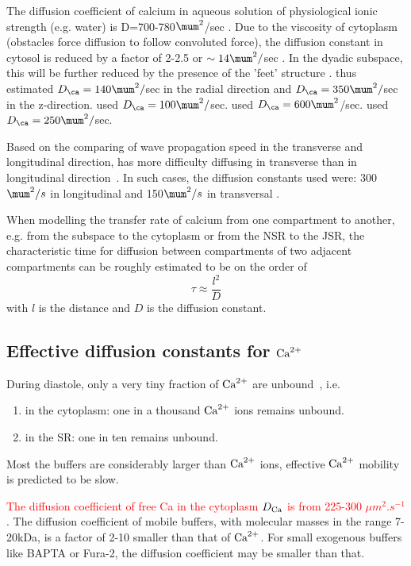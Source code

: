 The diffusion coefficient of calcium in aqueous solution of
physiological ionic strength (e.g. water) is D=700-780$\mum^2$/sec
\citep{wang1953}. Due to the viscosity of cytoplasm (obstacles force diffusion
to follow convoluted force), the diffusion constant in cytosol is reduced by a
factor of 2-2.5 or $\sim 14\mum^2/$sec \citep{kushmeric1969}. In the dyadic
subspace, this will be further reduced by the presence of the 'feet' structure
\citep{sommer1976}.
\citep{soeller1997} thus estimated $D_\ca = 140\mum^2/$sec in the radial
direction and $D_\ca = 350\mum^2/$sec in the z-direction. \citep{langer1996}
used $D_\ca = 100\mum^2/$sec. \citep{pratusevich1996} used $D_\ca =
600\mum^2$/sec. \citep{smith1998, sun2000mlc,groff2008} used $D_\ca=
250\mum^2/$sec. 

Based on the comparing of wave propagation speed in the transverse and
longitudinal direction,  has more difficulty diffusing in transverse
than in longitudinal direction~\citep{engel1994apc}. In such cases, the
diffusion constants used were:
300$\mum^2/s$ in longitudinal and 150$\mum^2/s$ in transversal
\citep{izu2006irr}.

When modelling the transfer rate of calcium from one compartment to another,
e.g. from the subspace to the cytoplasm or from the NSR to the JSR, the
characteristic time for diffusion between compartments of two adjacent
compartments can be roughly estimated to be on the order of 
\begin{equation}
\tau \approx \frac{l^2}{D}
\end{equation}
with $l$ is the distance and $D$ is the diffusion constant. 

\subsection{Effective diffusion constants for ${\text{Ca}^{2+}}$}
\label{sec:effect-diff-const}



During diastole, only a very tiny fraction of ${\text{Ca}^{2+}}$ are
unbound~\citep{Swietach2010}, i.e.
\begin{enumerate}
\item in the cytoplasm: one in a thousand ${\text{Ca}^{2+}}$ ions remains unbound.
\item in the SR: one in ten remains unbound.
\end{enumerate}
Most the buffers are considerably larger than ${\text{Ca}^{2+}}$ ions, effective
${\text{Ca}^{2+}}$ mobility is predicted to be slow. 

\begin{framed}
  \textcolor{red}{The diffusion coefficient of free Ca in the
    cytoplasm $D_{\ce{Ca}}$ is from 225-300 $\mu m^2.s^{-1}$}.
  The diffusion coefficient of mobile buffers, with molecular masses
  in the range 7-20kDa, is a factor of 2-10 smaller than that of
  ${\text{Ca}^{2+}}$. For small exogenous buffers like BAPTA or Fura-2, the
  diffusion coefficient may be smaller than that.
\end{framed}


